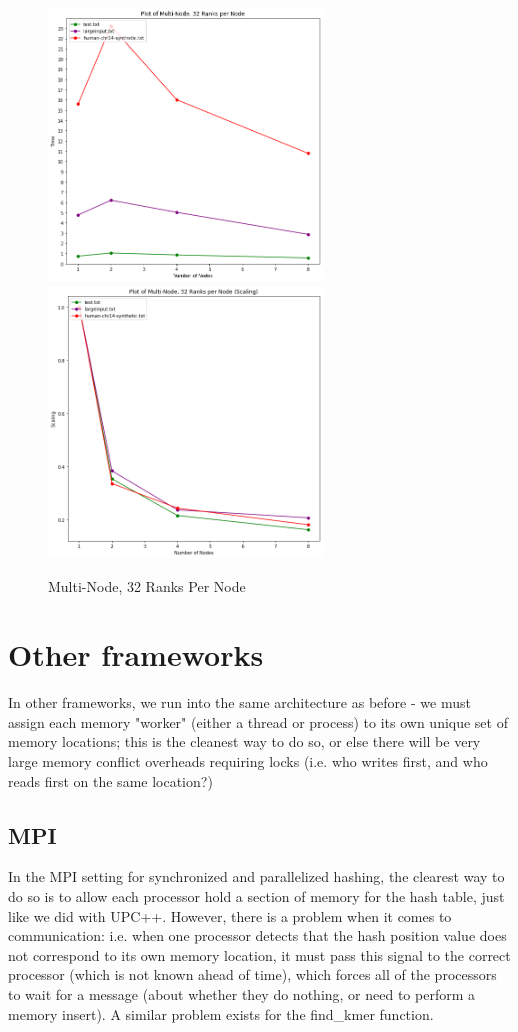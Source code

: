 \documentclass[12pt]{article}
\begin{document}
\begin{figure}[h]
  \caption{Multi-Node, 32 Ranks Per Node}
  \centering 
  \label{graph2}
  \includegraphics[width = 0.65\textwidth]{multi_node.png}
  \includegraphics[width = 0.65\textwidth]{multi_node_scaling.png}
\end{figure}

\section{Other frameworks}
In other frameworks, we run into the same architecture as before - we must assign each memory "worker" (either a thread or process) to its own unique set of memory locations; this is the cleanest way to do so, or else there will be very large memory conflict overheads requiring locks (i.e. who writes first, and who reads first on the same location?)
\subsection{MPI} 
In the MPI setting for synchronized and parallelized hashing, the clearest way to do so is to allow each processor hold a section of memory for the hash table, just like we did with UPC++. However, there is a problem when it comes to communication: i.e. when one processor detects that the hash position value does not correspond to its own memory location, it must pass this signal to the correct processor (which is not known ahead of time), which forces all of the processors to wait for a message (about whether they do nothing, or need to perform a memory insert). A similar problem exists for the find\_kmer function.
\end{document}
